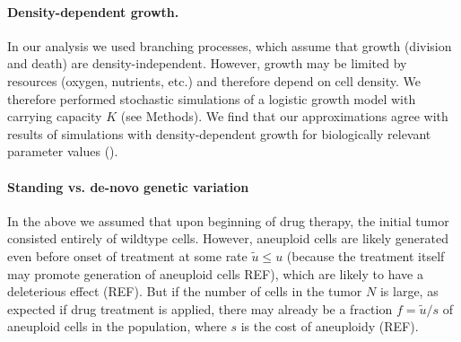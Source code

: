 \documentclass[12pt]{extarticle}
\newcommand{\presc}{p_\text{rescue}}
\begin{document}


\paragraph*{Density-dependent growth.}

In our analysis we used branching processes, which assume that growth (division and death) are density-independent. However, growth may be limited by resources (oxygen, nutrients, etc.) and therefore depend on cell density. 
We therefore performed stochastic simulations of a logistic growth model with carrying capacity $K$ (see Methods). 
We find that our approximations agree with results of simulations with density-dependent growth for biologically relevant parameter values ().

\paragraph*{Standing vs. de-novo genetic variation}

In the above we assumed that upon beginning of drug therapy, the initial tumor consisted entirely of wildtype cells.
However, aneuploid cells are likely generated even before onset of treatment at some rate $\tilde{u} \le u$ (because the treatment itself may promote generation of aneuploid cells REF), which are likely to have a deleterious effect (REF). %
But if the number of cells in the tumor $N$ is large, as expected if drug treatment is applied, there may already be a fraction $f=\tilde{u}/s$ of aneuploid cells in the population, where $s$ is the cost of aneuploidy (REF).
\end{document}
